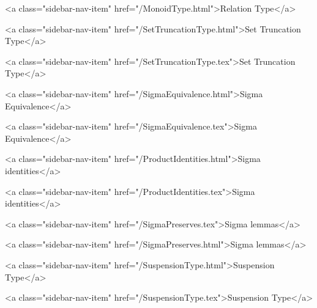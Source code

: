       
    
      
        
          <a class="sidebar-nav-item" href="/MonoidType.html">Relation Type</a>
        
      
    
      
        
          <a class="sidebar-nav-item" href="/SetTruncationType.html">Set Truncation Type</a>
        
      
    
      
        
          <a class="sidebar-nav-item" href="/SetTruncationType.tex">Set Truncation Type</a>
        
      
    
      
        
          <a class="sidebar-nav-item" href="/SigmaEquivalence.html">Sigma Equivalence</a>
        
      
    
      
        
          <a class="sidebar-nav-item" href="/SigmaEquivalence.tex">Sigma Equivalence</a>
        
      
    
      
        
          <a class="sidebar-nav-item" href="/ProductIdentities.html">Sigma identities</a>
        
      
    
      
        
          <a class="sidebar-nav-item" href="/ProductIdentities.tex">Sigma identities</a>
        
      
    
      
        
          <a class="sidebar-nav-item" href="/SigmaPreserves.tex">Sigma lemmas</a>
        
      
    
      
        
          <a class="sidebar-nav-item" href="/SigmaPreserves.html">Sigma lemmas</a>
        
      
    
      
        
          <a class="sidebar-nav-item" href="/SuspensionType.html">Suspension Type</a>
        
      
    
      
        
          <a class="sidebar-nav-item" href="/SuspensionType.tex">Suspension Type</a>
        
